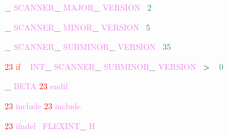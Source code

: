 \documentclass[8, usernames, dvipsnames]{beamer}
\begin{document}
\begin{frame}

 
 \textcolor{Sepia}{\_}
\textcolor{Violet}{SCANNER}\textcolor{Sepia}{\_}
\textcolor{Violet}{MAJOR}\textcolor{Sepia}{\_}
\textcolor{Violet}{VERSION}\textcolor{White}{\ }
\textcolor{SeaGreen}{2}

 \textcolor{Sepia}{\_}
\textcolor{Violet}{SCANNER}\textcolor{Sepia}{\_}
\textcolor{Violet}{MINOR}\textcolor{Sepia}{\_}
\textcolor{Violet}{VERSION}\textcolor{White}{\ }
\textcolor{SeaGreen}{5}

 \textcolor{Sepia}{\_}
\textcolor{Violet}{SCANNER}\textcolor{Sepia}{\_}
\textcolor{Violet}{SUBMINOR}\textcolor{Sepia}{\_}
\textcolor{Violet}{VERSION}\textcolor{White}{\ }
\textcolor{SeaGreen}{35}

  \textcolor{Red}{23}
\textcolor{OrangeRed}{if}
\textcolor{White}{\ }
\textcolor{Violet}{INT}\textcolor{Sepia}{\_}
\textcolor{Violet}{SCANNER}\textcolor{Sepia}{\_}
\textcolor{Violet}{SUBMINOR}\textcolor{Sepia}{\_}
\textcolor{Violet}{VERSION}\textcolor{White}{\ }
\textcolor{OliveGreen}{\textgreater}
\textcolor{White}{\ }
\textcolor{SeaGreen}{0}

 \textcolor{Sepia}{\_}
\textcolor{Violet}{BETA}
  \textcolor{Red}{23}
\textcolor{Violet}{endif}
 
 
 \end{frame}
\begin{frame}

  \textcolor{Red}{23}
\textcolor{Violet}{include} \textcolor{Red}{23}
\textcolor{Violet}{include}
 
 
 
 
 
  \textcolor{Red}{23}
\textcolor{Violet}{ifndef}\textcolor{White}{\ }
\textcolor{Violet}{FLEXINT}\textcolor{Sepia}{\_}
\textcolor{Violet}{H}
 
 
 \end{frame}
\end{document}
